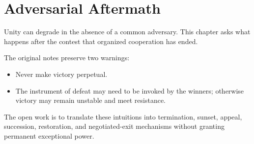 \chapter{Adversarial Aftermath}
\label{chap:adversarial-aftermath}


Unity can degrade in the absence of a common adversary. This chapter asks what
happens after the contest that organized cooperation has ended.

The original notes preserve two warnings:

\begin{itemize}
  \item Never make victory perpetual.
  \item The instrument of defeat may need to be invoked by the winners;
  otherwise victory may remain unstable and meet resistance.
\end{itemize}

The open work is to translate these intuitions into termination, sunset,
appeal, succession, restoration, and negotiated-exit mechanisms without
granting permanent exceptional power.
